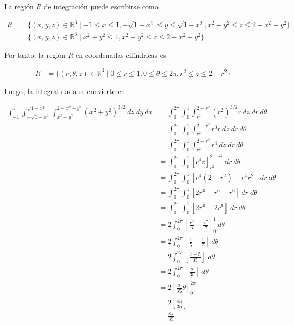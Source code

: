 \documentclass[12pt]{exam}
\begin{document}
\begin{questions}
  La región $R$ de integración puede escribirse como

  \begin{align*}
  R 
  &= \{ (x,y,z) \in \mathbb{R}^3 \mid -1 \leq x \leq 1, -\sqrt{1-x^2} \leq y \leq \sqrt{1-x^2}, x^2+y^2 \leq z \leq 2-x^2-y^2 \} \\
  &= \{ (x,y,z) \in \mathbb{R}^3 \mid x^2+y^2 \leq 1, x^2+y^2 \leq z \leq 2-x^2-y^2 \}
  \end{align*}

  Por tanto, la región $R$ en coordenadas cilíndricas es

  \begin{align*}
  R
  &= \{ (r, \theta, z) \in \mathbb{R}^3 \mid 0 \leq r \leq 1, 0 \leq \theta \leq 2\pi, r^2 \leq z \leq 2-r^2 \}
  \end{align*}

  Luego, la integral dada se convierte en

  \begin{align*}
  \int_{-1}^1 \int_{-\sqrt{1-x^2}}^{\sqrt{1-x^2}} \int_{x^2+y^2}^{2-x^2-y^2} (x^2+y^2)^{3/2} ~ dz ~ dy ~ dx
  &= \int_0^{2\pi} \int_0^1 \int_{r^2}^{2-r^2} (r^2)^{3/2} r ~ dz ~ dr ~ d\theta \\
  &= \int_0^{2\pi} \int_0^1 \int_{r^2}^{2-r^2} r^3 r ~ dz ~ dr ~ d\theta \\
  &= \int_0^{2\pi} \int_0^1 \int_{r^2}^{2-r^2} r^4 ~ dz ~ dr ~ d\theta \\
  &= \int_0^{2\pi} \int_0^1 \left[ r^4z \right]_{r^2}^{2-r^2} ~ dr ~ d\theta \\
  &= \int_0^{2\pi} \int_0^1 \left[ r^4(2-r^2) - r^4r^2 \right] ~ dr ~ d\theta \\
  &= \int_0^{2\pi} \int_0^1 \left[ 2r^4 - r^6 - r^6 \right] ~ dr ~ d\theta \\
  &= \int_0^{2\pi} \int_0^1 \left[ 2r^4 - 2r^6 \right] ~ dr ~ d\theta \\
  &= 2 \int_0^{2\pi} \left[ \frac{r^5}{5} - \frac{r^7}{7} \right]_0^1 ~ d\theta \\
  &= 2 \int_0^{2\pi} \left[ \frac{1}{5} - \frac{1}{7} \right] ~ d\theta \\
  &= 2 \int_0^{2\pi} \left[ \frac{7-5}{35} \right] ~ d\theta \\
  &= 2 \int_0^{2\pi} \left[ \frac{2}{35} \right] ~ d\theta \\
  &= 2 \left[ \frac{2}{35} \theta \right]_0^{2\pi} \\
  &= 2 \left[ \frac{4\pi}{35} \right] \\
  &= \frac{8\pi}{35}
  \end{align*}


\end{questions}
\end{document}
